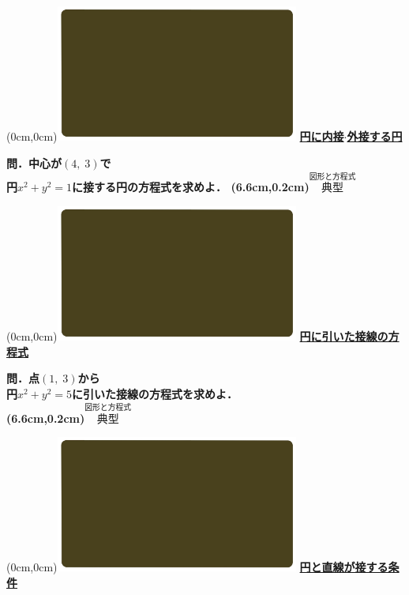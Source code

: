 \documentclass[10pt,
fleqn,
dvipdfmx,
uplatex
]{jsarticle}
\begin{document}
\at(0cm,0cm){\includegraphics[width=8cm,bb=0 0 1920 1080]{./media_local/smart_background/図形と方程式.jpeg}}
{\color{orange}\bf\boldmath\LARGE\underline{円に内接$\cdot$外接する円}}\vspace{0.3zw}

\huge 
\bf\boldmath 問．中心が$\left(4,\;3\right)$で\\円$x^2+y^2=1$に接する円の方程式を求めよ．
\at(6.6cm,0.2cm){\small\color{bradorange}$\overset{\text{図形と方程式}}{\text{典型}}$}


\newpage



\at(0cm,0cm){\includegraphics[width=8cm,bb=0 0 1920 1080]{./media_local/smart_background/図形と方程式.jpeg}}
{\color{orange}\bf\boldmath\Large\underline{円に引いた接線の方程式}}\vspace{0.3zw}

\huge 
\bf\boldmath 問．点$\left(1,\;3\right)$から\\
円$x^2+y^2=5$に引いた接線の方程式を求めよ．\\

\at(6.6cm,0.2cm){\small\color{bradorange}$\overset{\text{図形と方程式}}{\text{典型}}$}

\newpage



\at(0cm,0cm){\includegraphics[width=8cm,bb=0 0 1920 1080]{./media_local/smart_background/図形と方程式.jpeg}}
{\color{orange}\bf\boldmath\LARGE\underline{円と直線が接する条件}}\vspace{0.3zw}
\end{document}
